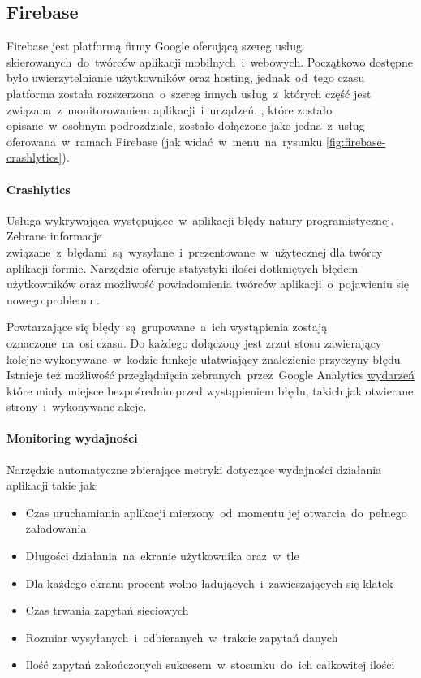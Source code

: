 \subsection{Firebase}
\label{sec:firebase}
Firebase jest platformą firmy Google oferującą szereg usług skierowanych~do~twórców aplikacji mobilnych~i~webowych. Początkowo dostępne było uwierzytelnianie użytkowników oraz hosting, jednak~od~tego czasu platforma została rozszerzona~o~szereg innych usług~z~których część jest związana~z~monitorowaniem aplikacji~i~urządzeń. , które zostało opisane~w~osobnym podrozdziale, zostało dołączone jako jedna~z~usług oferowana~w~ramach Firebase (jak widać~w~menu~na~rysunku \ref{fig:firebase-crashlytics}).


\paragraph{Crashlytics}
Usługa wykrywająca występujące~w~aplikacji błędy natury programistycznej. Zebrane informacje związane~z~błędami~są~wysyłane~i~prezentowane~w~użytecznej dla twórcy aplikacji formie. Narzędzie oferuje statystyki ilości dotkniętych błędem użytkowników oraz możliwość powiadomienia twórców aplikacji~o~pojawieniu się nowego problemu \cite{Fb_Crashlytics}.

Powtarzające się błędy~są~grupowane~a~ich wystąpienia zostają oznaczone~na~osi czasu. Do każdego dołączony jest zrzut stosu zawierający kolejne wykonywane~w~kodzie funkcje ułatwiający znalezienie przyczyny błędu. Istnieje też możliwość przeglądnięcia zebranych~przez~Google Analytics \hyperref[par:ga-events]{wydarzeń} które miały miejsce bezpośrednio przed wystąpieniem błędu, takich jak otwierane strony~i~wykonywane akcje. 

\paragraph{Monitoring wydajności}
Narzędzie automatyczne zbierające metryki dotyczące wydajności działania aplikacji takie jak:
\begin{itemize}
	\item Czas uruchamiania aplikacji mierzony~od~momentu jej otwarcia~do~pełnego załadowania
	\item Długości działania~na~ekranie użytkownika oraz~w~tle
	\item Dla każdego ekranu procent wolno ładujących~i~zawieszających się klatek
	\item Czas trwania zapytań sieciowych
	\item Rozmiar wysyłanych~i~odbieranych~w~trakcie zapytań danych
	\item Ilość zapytań zakończonych sukcesem~w~stosunku~do~ich całkowitej ilości
\end{itemize}
\bigskip

